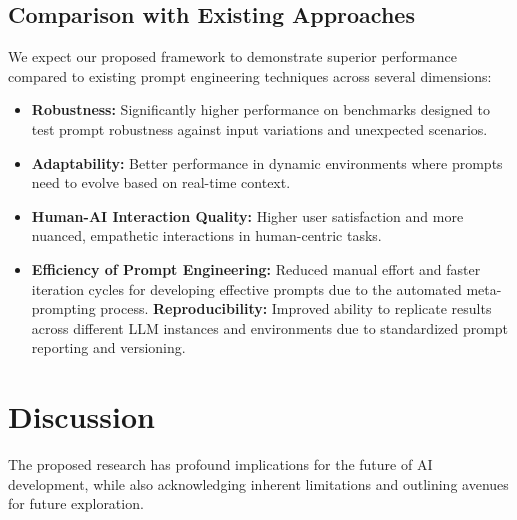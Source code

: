 \documentclass{article}
\begin{document}
\subsection{Comparison with Existing Approaches}
We expect our proposed framework to demonstrate superior performance compared to existing prompt engineering techniques across several dimensions:
\begin{itemize}
    \item \textbf{Robustness:} Significantly higher performance on benchmarks designed to test prompt robustness against input variations and unexpected scenarios.
    \item \textbf{Adaptability:} Better performance in dynamic environments where prompts need to evolve based on real-time context.
    \item \textbf{Human-AI Interaction Quality:} Higher user satisfaction and more nuanced, empathetic interactions in human-centric tasks.
    \item \textbf{Efficiency of Prompt Engineering:} Reduced manual effort and faster iteration cycles for developing effective prompts due to the automated meta-prompting process.
    \textbf{Reproducibility:} Improved ability to replicate results across different LLM instances and environments due to standardized prompt reporting and versioning.
\end{itemize}

\section{Discussion}
The proposed research has profound implications for the future of AI development, while also acknowledging inherent limitations and outlining avenues for future exploration.
\end{document}
